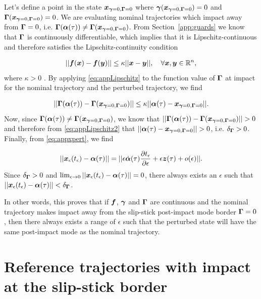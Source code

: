 \documentclass[../DC2017114Bouma.tex]{subfiles}
\begin{document}
Let's define a point in the state ${\boldsymbol{x}}_{\boldsymbol{\gamma}=0,\boldsymbol{\Gamma}=0}$ where $\boldsymbol{\gamma}({\boldsymbol{x}}_{\boldsymbol{\gamma}=0,\boldsymbol{\Gamma}=0})=0$ and $\boldsymbol{\Gamma}({\boldsymbol{x}}_{\boldsymbol{\gamma}=0,\boldsymbol{\Gamma}=0})=0$. We are evaluating nominal trajectories which impact away from $\boldsymbol{\Gamma} = 0$, i.e. $\boldsymbol{\Gamma}(\boldsymbol{\alpha}(\tau))\neq \boldsymbol{\Gamma}({\boldsymbol{x}}_{\boldsymbol{\gamma}=0,\boldsymbol{\Gamma}=0})$. From Section~\ref{app:guards} we know that $\boldsymbol{\Gamma}$ is continuously differentiable, which implies that it is Lipschitz-continuous and therefore satisfies the Lipschitz-continuity condition

\begin{align}
||{\boldsymbol{f}}({\boldsymbol{x}})-{\boldsymbol{f}}({\boldsymbol{y}})|| \leq \kappa||{\boldsymbol{x}}-{\boldsymbol{y}}||,\quad \forall {\boldsymbol{x}},{\boldsymbol{y}}\in\mathbb{R}^n,\label{eq:appLipschitz}
\end{align}
where $\kappa>0$ \cite{Leine2008}. By applying \eqref{eq:appLipschitz} to the function value of $\boldsymbol{\Gamma}$ at impact for the nominal trajectory and the perturbed trajectory, we find

\begin{align}
||\boldsymbol{\Gamma}(\boldsymbol{\alpha}(\tau)) - \boldsymbol{\Gamma}({\boldsymbol{x}}_{\boldsymbol{\gamma}=0,\boldsymbol{\Gamma}=0})||\leq \kappa||\boldsymbol{\alpha}(\tau)-{\boldsymbol{x}}_{\boldsymbol{\gamma}=0,\boldsymbol{\Gamma}=0}||.\label{eq:appLipschitz2}
\end{align}
Now, since $\boldsymbol{\Gamma}(\boldsymbol{\alpha}(\tau))\neq \boldsymbol{\Gamma}({\boldsymbol{x}}_{\boldsymbol{\gamma}=0,\boldsymbol{\Gamma}=0})$, we know that $||\Gammab(\alphab(\tau)) - \Gammab(\xb_{\gammab=0,\Gammab=0})||>0$ and therefore from \eqref{eq:appLipschitz2} that $||\alphab(\tau)-\xb_{\gammab=0,\Gammab=0}||>0$, i.e. $\delta_{\boldsymbol{\Gamma}} >0$. Finally, from \eqref{eq:appxpert}, we find

\begin{align}
||{\boldsymbol{x}}_\epsilon(t_\epsilon) - \boldsymbol{\alpha}(\tau)|| = ||\epsilon\dot{\boldsymbol{\alpha}}(\tau)\frac{\partial t_\epsilon}{\partial \epsilon} + \epsilon{\boldsymbol{z}}(\tau) + o(\epsilon)||.
\end{align}
Since $\delta_{\boldsymbol{\Gamma}} > 0$ and $\lim_{\epsilon\rightarrow 0}||{\boldsymbol{x}}_\epsilon(t_\epsilon) - \boldsymbol{\alpha}(\tau)||=0$, there always exists an $\epsilon$ such that $||{\boldsymbol{x}}_\epsilon(t_\epsilon) - \boldsymbol{\alpha}(\tau)||<\delta_{\boldsymbol{\Gamma}}$. 

In other words, this proves that if ${\boldsymbol{f}}$, $\boldsymbol{\gamma}$ and $\boldsymbol{\Gamma}$ are continuous and the nominal trajectory makes impact away from the slip-stick post-impact mode border $\boldsymbol{\Gamma} = 0$, then there always exists a range of $\epsilon$ such that the perturbed state will have the same post-impact mode as the nominal trajectory.


\section{Reference trajectories with impact at the slip-stick border}
\end{document}

